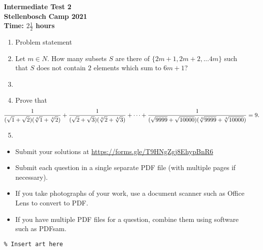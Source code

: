 \documentclass{article}
\begin{document}
\thispagestyle{empty}

\begin{center}
  \textbf{\Large Intermediate Test 2}
  \\ \vspace{1em}
  \textbf{\large Stellenbosch Camp 2021}
  \\ \vspace{1em}
  \textbf{\large Time: $2\frac{1}{2}$ hours}
\end{center}

\bigskip

\begin{enumerate}[itemsep=\fill]


\item %
Problem statement


\item %
Let $m \in {N}$. How many subsets $S$ are there of $\{2m+1,2m+2,...4m\}$ such that $S$ does not contain $2$ elements which sum to $6m+1$? 

\item %

\item %
Prove that
\[ \mspace{-36mu} \frac{1}{(\sqrt{1}+\sqrt{2})(\sqrt[4]{1}+\sqrt[4]{2})} +\frac{1}{(\sqrt{2}+\sqrt{3})(\sqrt[4]{2}+\sqrt[4]{3})} +\dotsb +\frac{1}{(\sqrt{9999}+\sqrt{10000})(\sqrt[4]{9999}+\sqrt[4]{10000})} = 9. \]


\item %

\end{enumerate}


\vfill
\begin{itemize}
	\item Submit your solutions at \href{https://forms.gle/T9HNgZgj8EhypBnR6}{https://forms.gle/T9HNgZgj8EhypBnR6}
	\item Submit each question in a single separate PDF file (with multiple pages if necessary).
	\item If you take photographs of your work, use a document scanner such as Office Lens to convert to PDF.
	\item If you have multiple PDF files for a question, combine them using software such as PDFsam.
\end{itemize}

\vfill
\centering
\begin{BVerbatim}
\end{BVerbatim}
\end{document}
